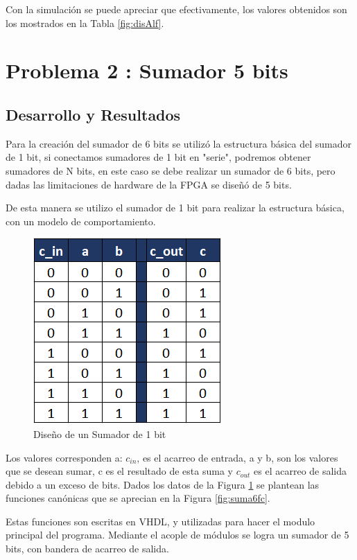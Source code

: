 \documentclass[journal]{IEEEtran}
\begin{document}
	Con la simulación se puede apreciar que efectivamente, los valores obtenidos son los mostrados en la Tabla \ref{fig:disAlf}. 
	
	\section{Problema 2 : Sumador 5 bits}
	\subsection{Desarrollo y Resultados}
	
	Para la creación del sumador de 6 bits se utilizó la estructura básica del sumador de 1 bit, si conectamos sumadores de 1 bit en "serie", podremos obtener sumadores de N bits, en este caso se debe realizar un sumador de 6 bits, pero dadas las limitaciones de hardware de la FPGA se diseñó de 5 bits.
	
	De esta manera se utilizo el sumador de 1 bit para realizar la estructura básica, con un modelo de comportamiento. 
	
	\begin{figure}[htb]
		\centering
		\includegraphics[scale = 0.8]{img/p2/sum6dis.png}
		\caption{Diseño de un Sumador de 1 bit}
		\label{fig:suma6dis}
	\end{figure}
	
	Los valores corresponden a: $c_{in}$, es el acarreo de entrada, a y b, son los valores que se desean sumar, c es el resultado de esta suma y $c_{out}$ es el acarreo de salida debido a un exceso de bits. Dados los datos de la Figura \ref{fig:suma6dis} se plantean las funciones canónicas que se aprecian en la Figura \ref{fig:suma6fc}.
	
	Estas funciones son escritas en VHDL, y utilizadas para hacer el modulo principal del programa. Mediante el acople de módulos se logra un sumador de 5 bits, con bandera de acarreo de salida. 
	
\end{document}
